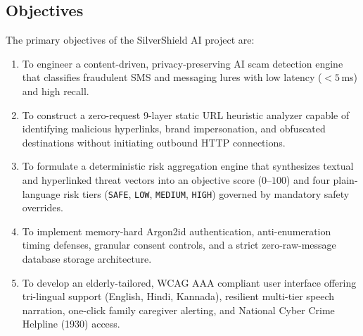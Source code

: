 \documentclass[conference]{IEEEtran}
\begin{document}
\subsection{Objectives}
The primary objectives of the SilverShield AI project are:
\begin{enumerate}
    \item To engineer a content-driven, privacy-preserving AI scam detection engine that classifies fraudulent SMS and messaging lures with low latency ($<5$\,ms) and high recall.
    \item To construct a zero-request 9-layer static URL heuristic analyzer capable of identifying malicious hyperlinks, brand impersonation, and obfuscated destinations without initiating outbound HTTP connections.
    \item To formulate a deterministic risk aggregation engine that synthesizes textual and hyperlinked threat vectors into an objective score ($0$--$100$) and four plain-language risk tiers (\texttt{SAFE}, \texttt{LOW}, \texttt{MEDIUM}, \texttt{HIGH}) governed by mandatory safety overrides.
    \item To implement memory-hard Argon2id authentication, anti-enumeration timing defenses, granular consent controls, and a strict zero-raw-message database storage architecture.
    \item To develop an elderly-tailored, WCAG AAA compliant user interface offering tri-lingual support (English, Hindi, Kannada), resilient multi-tier speech narration, one-click family caregiver alerting, and National Cyber Crime Helpline (1930) access.
\end{enumerate}
\end{document}
